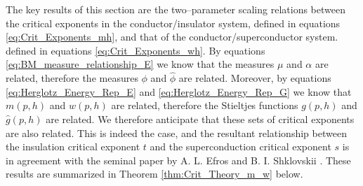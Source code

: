 \documentclass[english,12pt,jmp,graphicx]{revtex4-1}
\newcommand{\ph}{\hat{\phi}}
\begin{document}
The key results of this section are the two--parameter scaling
relations between the critical exponents in the conductor/insulator
system,
defined in equations \eqref{eq:Crit_Exponents_mh},
and that of the conductor/superconductor system.
defined in equations \eqref{eq:Crit_Exponents_wh}.
By equations  \eqref{eq:BM_measure_relationship_E} we know that the
measures $\mu$ and $\alpha$ are related, therefore the measures $\phi$ and $\ph$
are related. Moreover, by equations \eqref{eq:Herglotz_Energy_Rep_E}
and \eqref{eq:Herglotz_Energy_Rep_G} we know that $m(p,h)$ and
$w(p,h)$ are related, therefore the Stieltjes functions $g(p,h)$ and
$\hat{g}(p,h)$ are related. We therefore anticipate that these sets of
critical exponents 
are also related. This is indeed the case, and the resultant
relationship between the insulation critical exponent $t$ and the
superconduction critical exponent $s$ is in agreement with the seminal
paper by A. L. Efros and B. I. Shklovskii \cite{Efros:PSSB-303}.
These results are summarized in Theorem \ref{thm:Crit_Theory_m_w}
below. 
%
%
%
\end{document}
